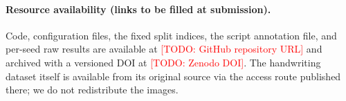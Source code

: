 \documentclass[11pt,a4paper]{article}
\newcommand{\todonote}[1]{\textcolor{red}{[TODO: #1]}}
\begin{document}
\paragraph{Resource availability (links to be filled at submission).}
Code, configuration files, the fixed split indices, the script
annotation file, and per-seed raw results are available at
\todonote{GitHub repository URL} and archived with a versioned DOI at
\todonote{Zenodo DOI}. The handwriting dataset itself is available
from its original source \citep{kashif2026} via the access route
published there; we do not redistribute the images.


\end{document}
